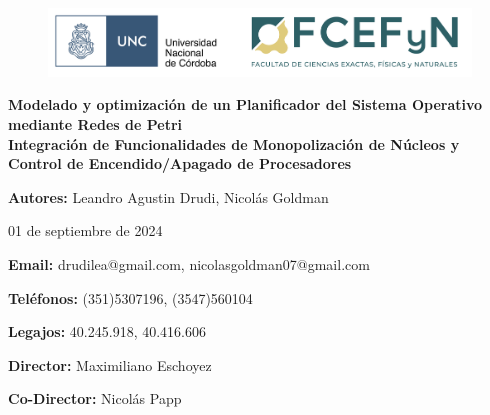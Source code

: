 \begin{titlepage}
    \begin{center}
        \vspace*{1cm}

        \begin{figure}
            \centering
            \begin{minipage}[t]{\textwidth}\centering
                \includegraphics[width=1\textwidth]{./images/color_UNC-FCEFyN.png}
            \end{minipage}\hfill
        \end{figure}

        \huge
        \textbf{Modelado y optimización de un Planificador del Sistema Operativo mediante Redes de Petri} \\

        \vspace{.5cm}
        \large
        \textbf{Integración de Funcionalidades de Monopolización de Núcleos y Control de Encendido/Apagado de Procesadores} \\

        \vspace{2cm}

        \Large
        \textbf{Autores:} Leandro Agustin Drudi, Nicolás Goldman

        \vspace{.5cm}

        \large
        01 de septiembre de 2024

        \vspace{1.5cm}

        \normalsize
        \textbf{Email:} drudilea@gmail.com, nicolasgoldman07@gmail.com

        \vspace{.5cm}

        \textbf{Teléfonos:} (351)5307196, (3547)560104

        \vspace{.5cm}

        \textbf{Legajos:} 40.245.918, 40.416.606

        \vspace{1.5cm}

        \textbf{Director:} Maximiliano Eschoyez

        \vspace{.5cm}

        \textbf{Co-Director:} Nicolás Papp

        \vspace{1cm}


        \vspace{0.5cm}

        \vfill

    \end{center}
\end{titlepage}